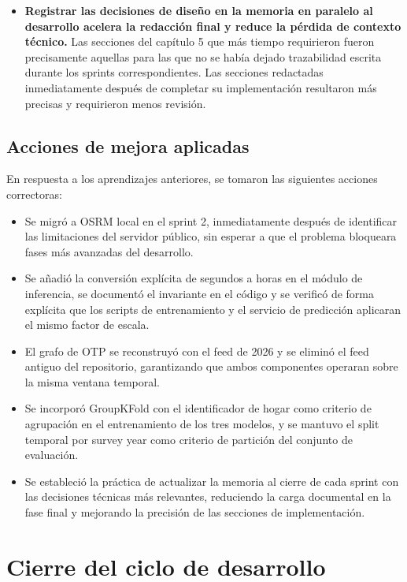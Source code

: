 \begin{itemize}
  \item \textbf{Registrar las decisiones de diseño en la memoria en paralelo al desarrollo acelera la redacción final y reduce la pérdida de contexto técnico.} Las secciones del capítulo 5 que más tiempo requirieron fueron precisamente aquellas para las que no se había dejado trazabilidad escrita durante los sprints correspondientes. Las secciones redactadas inmediatamente después de completar su implementación resultaron más precisas y requirieron menos revisión.
\end{itemize}

\subsection{Acciones de mejora aplicadas}

En respuesta a los aprendizajes anteriores, se tomaron las siguientes acciones correctoras:

\begin{itemize}
  \item Se migró a OSRM local en el sprint 2, inmediatamente después de identificar las limitaciones del servidor público, sin esperar a que el problema bloqueara fases más avanzadas del desarrollo.
  \item Se añadió la conversión explícita de segundos a horas en el módulo de inferencia, se documentó el invariante en el código y se verificó de forma explícita que los scripts de entrenamiento y el servicio de predicción aplicaran el mismo factor de escala.
  \item El grafo de OTP se reconstruyó con el feed de 2026 y se eliminó el feed antiguo del repositorio, garantizando que ambos componentes operaran sobre la misma ventana temporal.
  \item Se incorporó GroupKFold con el identificador de hogar como criterio de agrupación en el entrenamiento de los tres modelos, y se mantuvo el split temporal por survey year como criterio de partición del conjunto de evaluación.
  \item Se estableció la práctica de actualizar la memoria al cierre de cada sprint con las decisiones técnicas más relevantes, reduciendo la carga documental en la fase final y mejorando la precisión de las secciones de implementación.
\end{itemize}


\section{Cierre del ciclo de desarrollo}
\label{sec:scrum_cierre}

